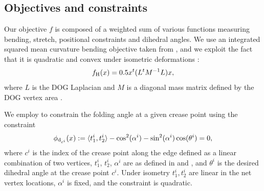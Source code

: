 \subsection{Objectives and constraints} \label{sec:dog_obj}
Our objective $f$ is composed of a weighted sum of various functions measuring bending, stretch, positional constraints and dihedral angles.
We use an integrated squared mean curvature bending objective taken from \cite{rabi2018shape}, and we exploit the fact that it is quadratic and convex under isometric deformations \cite{quadratic_bending}:
\begin{equation}
f_\text{H}(x) = 0.5x^t(L^tM^{-1}L)x,
\end{equation}
where $L$ is the DOG Laplacian and $M$ is a diagonal mass matrix defined by the DOG vertex area \cite{rabi2018shape}.

 We employ  to constrain the folding angle at a given crease point using the constraint
\begin{equation}
\phi_{\text{d}_{c^i}}(x) := \langle t_1^i, t_2^i \rangle - \cos^2(\alpha^i) - \sin^2(\alpha^i) \cos(\theta^i) = 0,
\end{equation}
where $c^i$ is the index of the crease point along the edge defined as a linear combination of two vertices, $t_1^i$, $t_2^i$, $\alpha^i$ are as defined in  and , and $\theta^i$ is the desired dihedral angle at the crease point $c^i$. Under isometry $t_1^i,t_2^i$ are linear in the net vertex locations, $\alpha^i$ is fixed, and the constraint is quadratic.

